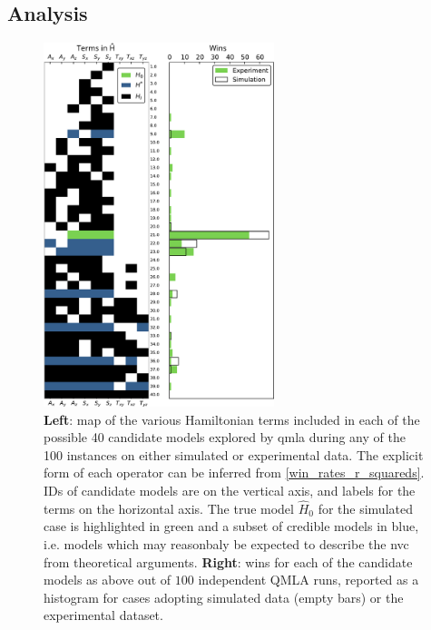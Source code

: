 \subsection{Analysis}\label{sec:exp_qmla_analysis}


\begin{figure}
    \begin{center}
        \includegraphics[width=0.6\textwidth]{experimental_study/figures/model_composition.pdf}
    \end{center}
    \caption[
        Models considered by \gls{qmla} for simulated/experimental  data, and their win rates.
    ]{
    \textbf{Left}: map of the various Hamiltonian terms included in each of the possible 40 candidate models explored by \gls{qmla}
    during any of the 100 instances on either simulated or experimental data.
    The explicit form of each operator can be inferred from \cref{win_rates_r_squareds}.
    IDs of candidate models are on the vertical axis, and labels for the terms on the horizontal axis.
    The true model $\hat{H}_0$ for the simulated case is highlighted in green and a subset of credible models in blue, 
    i.e. models which may reasonbaly be expected to describe the \gls{nvc} from theoretical arguments.
    \textbf{Right}: wins for each of the candidate models as above out of $100$ independent QMLA runs, 
    reported as a histogram for cases adopting simulated data (empty bars) or the experimental dataset.
    } 
    \label{fig:nv_model_composition}
\end{figure}


